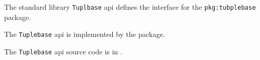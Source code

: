 
The standard library {\tt Tuplbase} api defines the interface for the {\tt pkg:tubplebase} package.

The {\tt Tuplebase} api is implemented by the 
 package.

The {\tt Tuplebase} api source code is in .
